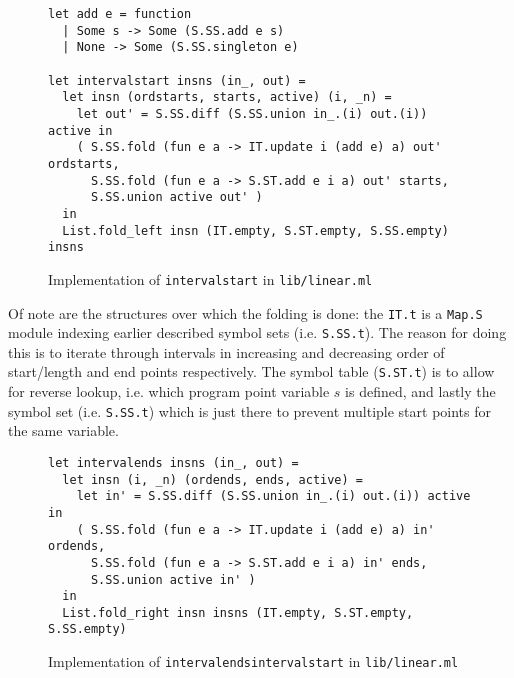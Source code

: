 \documentclass{article}
\begin{document}
\begin{figure}[H]
  \centering
   \begin{minipage}[b]{0.88\textwidth}
     \centering
     \begin{verbatim}
let add e = function
  | Some s -> Some (S.SS.add e s)
  | None -> Some (S.SS.singleton e)

let intervalstart insns (in_, out) =
  let insn (ordstarts, starts, active) (i, _n) =
    let out' = S.SS.diff (S.SS.union in_.(i) out.(i)) active in
    ( S.SS.fold (fun e a -> IT.update i (add e) a) out' ordstarts,
      S.SS.fold (fun e a -> S.ST.add e i a) out' starts,
      S.SS.union active out' )
  in
  List.fold_left insn (IT.empty, S.ST.empty, S.SS.empty) insns
     \end{verbatim}
     \caption{Implementation of \texttt{intervalstart} in \texttt{lib/linear.ml}}\label{fig:livenessstarts.ml}
   \end{minipage}
\end{figure}

\noindent Of note are the structures over which the folding is done: the \texttt{IT.t} is a \texttt{Map.S} module indexing earlier described symbol sets (i.e. \texttt{S.SS.t}). The reason for doing this is to iterate through intervals in increasing and decreasing order of start/length and end points respectively. The symbol table (\texttt{S.ST.t}) is to allow for reverse lookup, i.e. which program point variable \(s\) is defined, and lastly the symbol set (i.e. \texttt{S.SS.t}) which is just there to prevent multiple start points for the same variable.


\begin{figure}[H]
  \centering
   \begin{minipage}[b]{0.95\textwidth}
     \centering
     \begin{verbatim}
let intervalends insns (in_, out) =
  let insn (i, _n) (ordends, ends, active) =
    let in' = S.SS.diff (S.SS.union in_.(i) out.(i)) active in
    ( S.SS.fold (fun e a -> IT.update i (add e) a) in' ordends,
      S.SS.fold (fun e a -> S.ST.add e i a) in' ends,
      S.SS.union active in' )
  in
  List.fold_right insn insns (IT.empty, S.ST.empty, S.SS.empty)
     \end{verbatim}
     \caption{Implementation of \texttt{intervalendsintervalstart} in \texttt{lib/linear.ml}}\label{fig:intervalends.ml}
   \end{minipage}
\end{figure}
\end{document}
